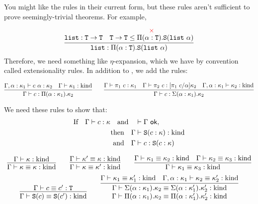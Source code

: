 You might like the rules  in their current form, but
these rules aren't sufficient to prove seemingly-trivial theorems. For example,

\[ \infer{\lst : \Pi(\alpha : \T). \S(\lst~\alpha)}
    {\lst : \T \to \T
    &\deduce{\T \to \T \le \Pi(\alpha : \T) . \S(\lst~\alpha)}{\textcolor{red}{\times}}
    }
\]
Therefore, we need something like $\eta$-expansion, which we have by convention
called extensionality rules. In addition to , we add the rules:
\begin{judgment}
  \[
    \infer{\Gamma \vdash c : \Pi(\alpha : \kappa_1).\kappa_2}
      {\Gamma, \alpha : \kappa_1 \vdash c~\alpha : \kappa_2
      &\Gamma \vdash \kappa_1 : \kind
      }
    \qquad
    \infer{\Gamma \vdash c : \Sigma(\alpha : \kappa_1).\kappa_2}
      {\Gamma \vdash \pi_1~c : \kappa_1
      &\Gamma \vdash \pi_2~c : [\pi_1~c/\alpha]\kappa_2
      &\Gamma, \alpha : \kappa_1 \vdash \kappa_2 : \kind
      }
  \]
\end{judgment}

We need these rules to show that:
\begin{align*}
  \text{If} \quad \Gamma \vdash c : \kappa \quad \text{and} \quad &\vdash \Gamma~\mathsf{ok},\\
  \text{then} \quad \Gamma &\vdash \textnormal{\texttt{S}}(c : \kappa) : \textnormal{kind}\\
  \text{and} \quad \Gamma &\vdash c : \textnormal{\texttt{S}}(c : \kappa)
\end{align*}

\begin{judgment}
  \[
    \infer{\Gamma \vdash \kappa \equiv \kappa : \kind}{\Gamma \vdash \kappa : \kind}
    \qquad
    \infer{\Gamma \vdash \kappa \equiv \kappa' : \kind}
          {\Gamma \vdash \kappa' \equiv \kappa : \kind}
    \qquad
    \infer{\Gamma \vdash \kappa_1 \equiv \kappa_3 : \kind}
          {\Gamma \vdash \kappa_1 \equiv \kappa_2 : \kind
          &\Gamma \vdash \kappa_2 \equiv \kappa_3 : \kind
          }
  \]
  \[
    \infer{\Gamma \vdash \S(c) \equiv \S(c') : \kind}
          {\Gamma \vdash c \equiv c' : \T}
    \qquad
    \infer{
      \deduce
        {\Gamma \vdash \Pi(\alpha : \kappa_1).\kappa_2 \equiv
          \Pi(\alpha : \kappa_1').\kappa_2' : \kind}
        {\Gamma \vdash \Sigma(\alpha : \kappa_1).\kappa_2 \equiv
          \Sigma(\alpha : \kappa_1').\kappa_2' : \kind}}
      {\Gamma \vdash \kappa_1 \equiv \kappa_1' : \kind
      &\Gamma, \alpha : \kappa_1 \vdash \kappa_2 \equiv \kappa_2' : \kind
      }
  \]
\end{judgment}

